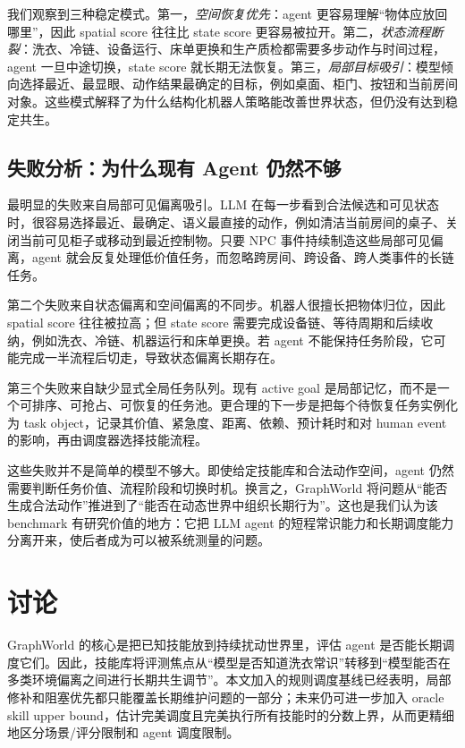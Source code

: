 \documentclass[journal]{IEEEtran}
\begin{document}
我们观察到三种稳定模式。第一，\emph{空间恢复优先}：agent 更容易理解“物体应放回哪里”，因此 spatial score 往往比 state score 更容易被拉开。第二，\emph{状态流程断裂}：洗衣、冷链、设备运行、床单更换和生产质检都需要多步动作与时间过程，agent 一旦中途切换，state score 就长期无法恢复。第三，\emph{局部目标吸引}：模型倾向选择最近、最显眼、动作结果最确定的目标，例如桌面、柜门、按钮和当前房间对象。这些模式解释了为什么结构化机器人策略能改善世界状态，但仍没有达到稳定共生。

\subsection{失败分析：为什么现有 Agent 仍然不够}
最明显的失败来自局部可见偏离吸引。LLM 在每一步看到合法候选和可见状态时，很容易选择最近、最确定、语义最直接的动作，例如清洁当前房间的桌子、关闭当前可见柜子或移动到最近控制物。只要 NPC 事件持续制造这些局部可见偏离，agent 就会反复处理低价值任务，而忽略跨房间、跨设备、跨人类事件的长链任务。

第二个失败来自状态偏离和空间偏离的不同步。机器人很擅长把物体归位，因此 spatial score 往往被拉高；但 state score 需要完成设备链、等待周期和后续收纳，例如洗衣、冷链、机器运行和床单更换。若 agent 不能保持任务阶段，它可能完成一半流程后切走，导致状态偏离长期存在。

第三个失败来自缺少显式全局任务队列。现有 active goal 是局部记忆，而不是一个可排序、可抢占、可恢复的任务池。更合理的下一步是把每个待恢复任务实例化为 task object，记录其价值、紧急度、距离、依赖、预计耗时和对 human event 的影响，再由调度器选择技能流程。

这些失败并不是简单的模型不够大。即使给定技能库和合法动作空间，agent 仍然需要判断任务价值、流程阶段和切换时机。换言之，GraphWorld 将问题从“能否生成合法动作”推进到了“能否在动态世界中组织长期行为”。这也是我们认为该 benchmark 有研究价值的地方：它把 LLM agent 的短程常识能力和长期调度能力分离开来，使后者成为可以被系统测量的问题。

\section{讨论}
GraphWorld 的核心是把已知技能放到持续扰动世界里，评估 agent 是否能长期调度它们。因此，技能库将评测焦点从“模型是否知道洗衣常识”转移到“模型能否在多类环境偏离之间进行长期共生调节”。本文加入的规则调度基线已经表明，局部修补和阻塞优先都只能覆盖长期维护问题的一部分；未来仍可进一步加入 oracle skill upper bound，估计完美调度且完美执行所有技能时的分数上界，从而更精细地区分场景/评分限制和 agent 调度限制。
\end{document}
